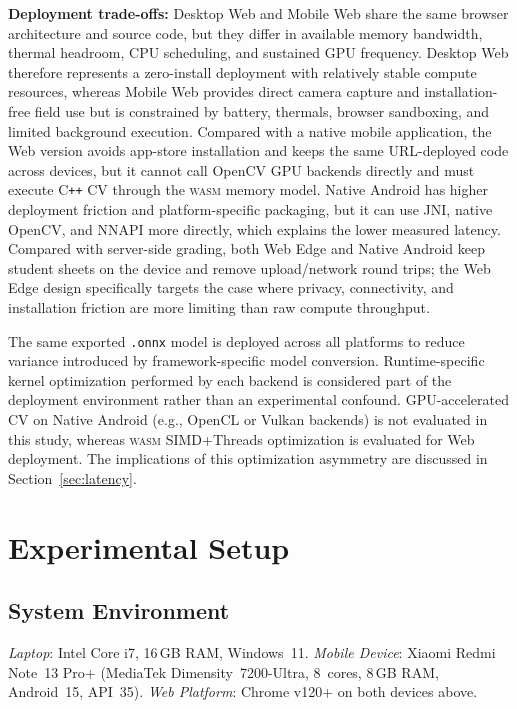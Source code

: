 \documentclass[conference]{IEEEtran}
\newcommand{\wasm}{\textsc{wasm}}
\begin{document}
\textbf{Deployment trade-offs:}
Desktop Web and Mobile Web share the same browser architecture and source code, but they differ in available memory bandwidth, thermal headroom, CPU scheduling, and sustained GPU frequency. Desktop Web therefore represents a zero-install deployment with relatively stable compute resources, whereas Mobile Web provides direct camera capture and installation-free field use but is constrained by battery, thermals, browser sandboxing, and limited background execution. Compared with a native mobile application, the Web version avoids app-store installation and keeps the same URL-deployed code across devices, but it cannot call OpenCV GPU backends directly and must execute C\texttt{++} CV through the \wasm{} memory model. Native Android has higher deployment friction and platform-specific packaging, but it can use JNI, native OpenCV, and NNAPI more directly, which explains the lower measured latency. Compared with server-side grading, both Web Edge and Native Android keep student sheets on the device and remove upload/network round trips; the Web Edge design specifically targets the case where privacy, connectivity, and installation friction are more limiting than raw compute throughput.

The same exported \texttt{.onnx} model is deployed across all platforms to reduce variance introduced by framework-specific model conversion. Runtime-specific kernel optimization performed by each backend is considered part of the deployment environment rather than an experimental confound. GPU-accelerated CV on Native Android (e.g., OpenCL or Vulkan backends) is not evaluated in this study, whereas \wasm{} SIMD+Threads optimization is evaluated for Web deployment. The implications of this optimization asymmetry are discussed in Section~\ref{sec:latency}.
\section{Experimental Setup}

\subsection{System Environment}

\textit{Laptop}: Intel Core i7, 16\,GB RAM, Windows~11.
\textit{Mobile Device}: Xiaomi Redmi Note~13 Pro+
(MediaTek Dimensity~7200-Ultra, 8~cores, 8\,GB RAM,
Android~15, API~35).
\textit{Web Platform}: Chrome v120+ on both devices above. 
\end{document}
